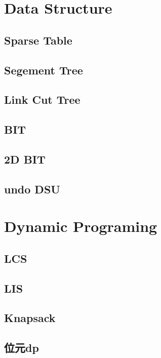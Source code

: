 \section{Data Structure}
\subsection{Sparse Table}

\subsection{Segement Tree}

\subsection{Link Cut Tree}

\subsection{BIT}

\subsection{2D BIT}

\subsection{undo DSU}


\section{Dynamic Programing}
\subsection{LCS}

\subsection{LIS}

\subsection{Knapsack}

\subsection{位元dp}

